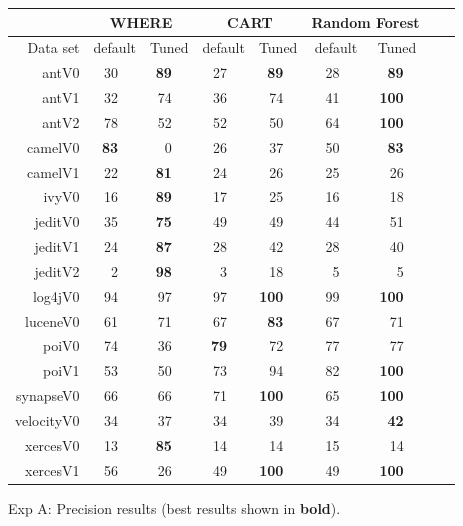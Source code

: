 \documentclass{acm_proc_article-sp}
\begin{document}
\begin{figure}[!b]
\renewcommand{\baselinestretch}{0.8} 
\newcommand{\rone}{}
\newcommand{\rtwo}{}
\newcommand{\rthree}{}
\newcommand{\rfour}{} 
\newcommand{\rfive}{}
\scriptsize    

\begin{tabular}{r|rl|rl|rl|rl|rl|rlrl}
      &   \multicolumn{4}{c|}{WHERE}         &   \multicolumn{4}{c|}{CART}         &   \multicolumn{4}{c}{Random Forest}         \\\hline
  Data set   &   \multicolumn{2}{c}{default}         &   \multicolumn{2}{c|}{Tuned}         &   \multicolumn{2}{c}{default}         &   \multicolumn{2}{c|}{Tuned}    &   \multicolumn{2}{c}{default}  &   \multicolumn{2}{c}{Tuned}\\\hline
antV0 & 30 &   & {\bf 89} &   & 27 &   & {\bf 89} &   & 28 &   & {\bf 89} &  \\
antV1 & 32 &   & 74 &   & 36 &   & 74 &   & 41 &   & {\bf 100} &  \\
antV2 & 78 &   & 52 &   & 52 &   & 50 &   & 64 &   & {\bf 100} &  \\
camelV0 & {\bf 83} &   & 0 &   & 26 &   & 37 &   & 50 &   & {\bf 83} &  \\
camelV1 & 22 &   & {\bf 81} &   & 24 &   & 26 &   & 25 &   & 26 &  \\
ivyV0 & 16 &   & {\bf 89} &   & 17 &   & 25 &   & 16 &   & 18 &  \\
jeditV0 & 35 &   & {\bf 75} &   & 49 &   & 49 &   & 44 &   & 51 &  \\
jeditV1 & 24 &   & {\bf 87} &   & 28 &   & 42 &   & 28 &   & 40 &  \\
jeditV2 & 2 &   & {\bf 98} &   & 3 &   & 18 &   & 5 &   & 5 &  \\
log4jV0 & 94 &   & 97 &   & 97 &   & {\bf 100} &   & 99 &   & {\bf 100} &  \\
luceneV0 & 61 &   & 71 &   & 67 &   & {\bf 83} &   & 67 &   & 71 &  \\
poiV0 & 74 &   & 36 &   & {\bf 79} &   & 72 &   & 77 &   & 77 &  \\
poiV1 & 53 &   & 50 &   & 73 &   & 94 &   & 82 &   & {\bf 100} &  \\
synapseV0 & 66 &   & 66 &   & 71 &   & {\bf 100} &   & 65 &   & {\bf 100} &  \\
velocityV0 & 34 &   & 37 &   & 34 &   & 39 &   & 34 &   & {\bf 42} &  \\
xercesV0 & 13 &   & {\bf 85} &   & 14 &   & 14 &   & 15 &   & 14 &  \\
xercesV1 & 56 &   & 26 &   & 49 &   & {\bf 100} &   & 49 &   & {\bf 100} &  \\

\end{tabular}
\caption{ Exp A: Precision results (best results  shown in {\bf bold}).}
\label{fig:precisionbars}
\end{figure}
\end{document}
